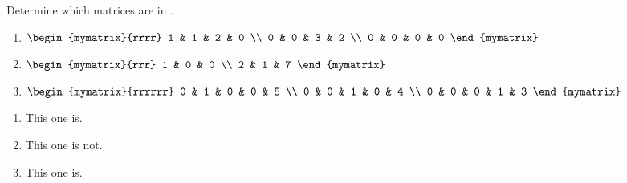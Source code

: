 \begin{ex} Determine which matrices are in {\ef}.

\begin{enumerate}
\item $\begin{mymatrix}{rrrr}
1 & 1 & 2 & 0 \\
0 & 0 & 3 & 2 \\
0 & 0 & 0 & 0
\end{mymatrix} $

\item $\begin{mymatrix}{rrr}
1 & 0 & 0 \\
2 & 1 & 7
\end{mymatrix} $

\item $\begin{mymatrix}{rrrrrr}
0 & 1 & 0 & 0 & 5 \\
0 & 0 & 1 & 0 & 4 \\
0 & 0 & 0 & 1 & 3
\end{mymatrix} $
\end{enumerate}
\begin{sol}
\begin{enumerate}
\item This one is.
\item This one is not.
\item This one is.
\end{enumerate}
\end{sol}
\end{ex}

